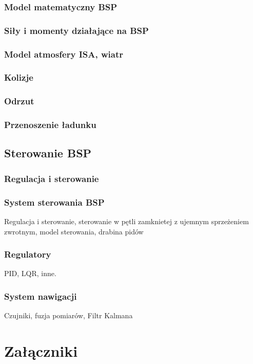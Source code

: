 \documentclass[15pt]{sprawozdanie}
\begin{document}
\subsubsection{Model matematyczny BSP}
\subsubsection{Siły i momenty działające na BSP}
\subsubsection{Model atmosfery ISA, wiatr}
\subsubsection{Kolizje}
\subsubsection{Odrzut}
\subsubsection{Przenoszenie ładunku}
\subsection{Sterowanie BSP}
\subsubsection{Regulacja i sterowanie}

\subsubsection{System sterowania BSP}
Regulacja i sterowanie, sterowanie w pętli zamknietej z ujemnym sprzeżeniem zwrotnym, model sterowania, drabina pidów
\subsubsection{Regulatory}
PID, LQR, inne.
\subsubsection{System nawigacji}
Czujniki, fuzja pomiarów, Filtr Kalmana




\color{black}
\newpage
\section{Załączniki}
\end{document}
